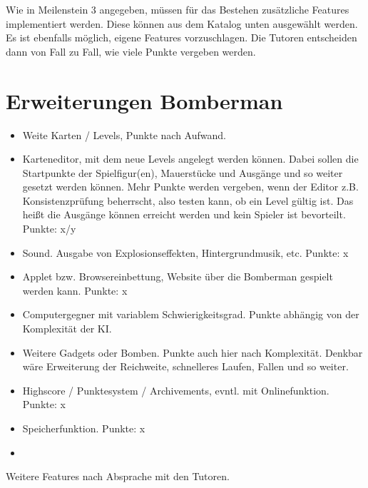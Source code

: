 \documentclass{programmierpraktikum}
\subtitle{Bomberman}
\begin{document}
\maketitle
Wie in Meilenstein 3 angegeben, müssen für das Bestehen zusätzliche Features implementiert werden. Diese können aus dem Katalog unten ausgewählt werden. Es ist ebenfalls möglich, eigene Features vorzuschlagen. Die Tutoren entscheiden dann von Fall zu Fall, wie viele Punkte vergeben werden.
\section{Erweiterungen Bomberman}
\begin{itemize}
  \item Weite Karten / Levels, Punkte nach Aufwand.
  \item Karteneditor, mit dem neue Levels angelegt werden können. Dabei sollen die Startpunkte der Spielfigur(en), Mauerstücke und Ausgänge und so weiter gesetzt werden können. Mehr Punkte werden vergeben, wenn der Editor z.B. Konsistenzprüfung beherrscht, also testen kann, ob ein Level gültig ist. Das heißt die Ausgänge können erreicht werden und kein Spieler ist bevorteilt. Punkte: x/y
  \item Sound. Ausgabe von Explosionseffekten, Hintergrundmusik, etc. Punkte: x
  \item Applet bzw. Browsereinbettung, Website über die Bomberman gespielt werden kann. Punkte: x
  \item Computergegner mit variablem Schwierigkeitsgrad. Punkte abhängig von der Komplexität der KI.
  \item Weitere Gadgets oder Bomben. Punkte auch hier nach Komplexität. Denkbar wäre Erweiterung der Reichweite, schnelleres Laufen, Fallen und so weiter.
  \item Highscore / Punktesystem / Archivements, evntl. mit Onlinefunktion. Punkte: x
  \item Speicherfunktion. Punkte: x
  \item 
\end{itemize}
Weitere Features nach Absprache mit den Tutoren.
\end{document}
